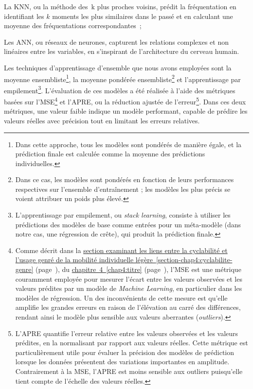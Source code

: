 \begin{refsegment}
\begin{customitemize}
    \item La \acrfull{KNN}, ou la méthode des~k plus proches voisins, prédit la fréquentation en identifiant les \(k\) moments les plus similaires dans le passé et en calculant une moyenne des fréquentations correspondantes~;
    \item Les \acrfull{ANN}, ou réseaux de neurones, capturent les relations complexes et non linéaires entre les variables, en s'inspirant de l'architecture du cerveau humain.
\end{customitemize}%

Les techniques d'apprentissage d'ensemble que nous avons employées sont la moyenne ensembliste\footnote{
    Dans cette approche, tous les modèles sont pondérés de manière égale, et la prédiction finale est calculée comme la moyenne des prédictions individuelles.
}, la moyenne pondérée ensembliste\footnote{
    Dans ce cas, les modèles sont pondérés en fonction de leurs performances respectives sur l'ensemble d'entraînement ; les modèles les plus précis se voient attribuer un poids plus élevé.
} et l'apprentissage par empilement\footnote{
    L'apprentissage par empilement, ou \textsl{stack learning}, consiste à utiliser les prédictions des modèles de base comme entrées pour un méta-modèle (dans notre cas, une régression de crête), qui produit la prédiction finale.
}. L'évaluation de ces modèles a été réalisée à l'aide des métriques basées sur l'\acrfull{MSE}\footnote{
    Comme décrit dans la \hyperref[section-chap4:cyclabilite-genre]{section examinant les liens entre la cyclabilité et l'usage genré de la mobilité individuelle légère~\ref{section-chap4:cyclabilite-genre}} (page~\pageref{section-chap4:cyclabilite-genre}), du \hyperref[chap4:titre]{chapitre~4~\ref{chap4:titre}} (page~\pageref{chap4:titre}), l'\acrfull{MSE} est une métrique couramment employée pour mesurer l'écart entre les valeurs observées et les valeurs prédites par un modèle de \textsl{Machine Learning}, en particulier dans les modèles de régression. Un des inconvénients de cette mesure est qu'elle amplifie les grandes erreurs en raison de l'élévation au carré des différences, rendant ainsi le modèle plus sensible aux valeurs aberrantes (\textsl{outliers}).
} et l'\acrfull{APRE}, ou la réduction ajustée de l'erreur\footnote{
    L'\acrfull{APRE} quantifie l'erreur relative entre les valeurs observées et les valeurs prédites, en la normalisant par rapport aux valeurs réelles. Cette \gls{métrique} est particulièrement utile pour évaluer la précision des modèles de prédiction lorsque les données présentent des variations importantes en amplitude. Contrairement à la \acrshort{MSE}, l'\acrshort{APRE} est moins sensible aux outliers puisqu'elle tient compte de l'échelle des valeurs réelles. 
}. Dans ces deux métriques, une valeur faible indique un modèle performant, capable de prédire les valeurs réelles avec précision tout en limitant les erreurs relatives.%


\end{refsegment}
